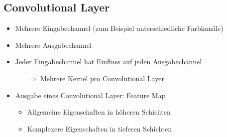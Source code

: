 \documentclass[
	aspectratio=169,
	8pt
]{beamer}
\begin{document}
\subsection{Convolutional Layer}
\begin{frame}[t]{\insertsubsection}
\begin{itemize}
\item Mehrere Eingabechannel (zum Beispiel unterschiedliche Farbkanäle)
\item Mehrere Ausgabechannel
\item Jeder Eingabechannel hat Einfluss auf jeden Ausgabechannel
\begin{itemize}
\item[\color{presentationRed}$\Rightarrow$] Mehrere Kernel pro Convolutional Layer
\end{itemize}
\item Ausgabe eines Convolutional Layer: Feature Map
\begin{itemize}
\item Allgemeine Eigenschaften in höheren Schichten
\item Komplexere Eigenschaften in tieferen Schichten
\end{itemize}
\end{itemize}
\end{frame}
\end{document}
